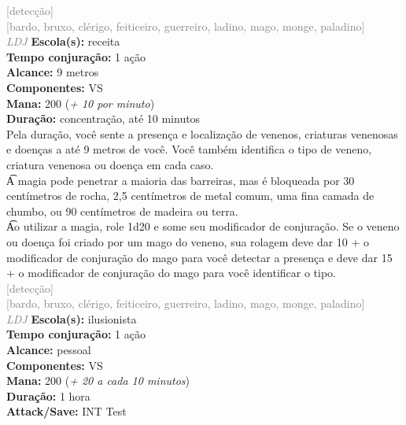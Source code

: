 \documentclass{RPG_Adventure}[2021/10/20]
\begin{document}
{\scriptsize \textcolor{gray}{[detecção]\\}}
{\scriptsize \textcolor{gray}{[bardo, bruxo, clérigo, feiticeiro, guerreiro, ladino, mago, monge, paladino]\\}}
{\tiny \textcolor{gray}{\textit{LDJ}}}
{\small \t \textbf{Escola(s):} receita\\\t \textbf{Tempo conjuração:} 1 ação\\\t \textbf{Alcance:} 9 metros\\\t \textbf{Componentes:} VS\\\t \textbf{Mana:} 200 (\textit{+ 10 por minuto})\\\t \textbf{Duração:} concentração, até 10 minutos\\}
{\normalsize Pela duração, você sente a presença e localização de venenos, criaturas venenosas e doenças a até 9 metros de você. Você também identifica o tipo de veneno, criatura venenosa ou doença em cada caso.\\\t A magia pode penetrar a maioria das barreiras, mas é bloqueada por 30 centímetros de rocha, 2,5 centímetros de metal comum, uma fina camada de chumbo, ou 90 centímetros de madeira ou terra.\\\t Ao utilizar a magia, role 1d20 e some seu modificador de conjuração. Se o veneno ou doença foi criado por um mago do veneno, sua rolagem deve dar 10 + o modificador de conjuração do mago para você detectar a presença e deve dar 15 + o modificador de conjuração do mago para você identificar o tipo.\\}
{\scriptsize \textcolor{gray}{[detecção]\\}}
{\scriptsize \textcolor{gray}{[bardo, bruxo, clérigo, feiticeiro, guerreiro, ladino, mago, monge, paladino]\\}}
{\tiny \textcolor{gray}{\textit{LDJ}}}
{\small \t \textbf{Escola(s):} ilusionista\\\t \textbf{Tempo conjuração:} 1 ação\\\t \textbf{Alcance:} pessoal\\\t \textbf{Componentes:} VS\\\t \textbf{Mana:} 200 (\textit{+ 20 a cada 10 minutos})\\\t \textbf{Duração:} 1 hora\\\t \textbf{Attack/Save:} INT Test\\}
\end{document}

